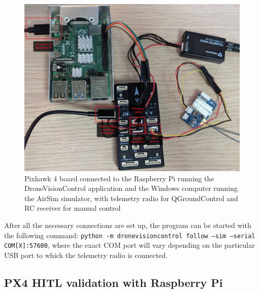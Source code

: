 \begin{figure}
  \centering
  \includegraphics[width=\textwidth, keepaspectratio]{img/hitl-setup-picture.jpg}
  \caption{Pixhawk 4 board connected to the Raspberry Pi running the DroneVisionControl application and the Windows computer running the AirSim simulator, with telemetry radio for QGroundControl and RC receiver for manual control}
  \label{fig:hitl-setup-picture}
\end{figure}

After all the necessary connections are set up, the program can be started with the following command:
\texttt{python -m dronevisioncontrol follow --sim --serial COM[X]:57600}, where the exact COM port will vary depending on the particular USB port to which the telemetry radio is connected.


\subsection{PX4 HITL validation with Raspberry Pi}
\label{sec:test-5-rpi}


